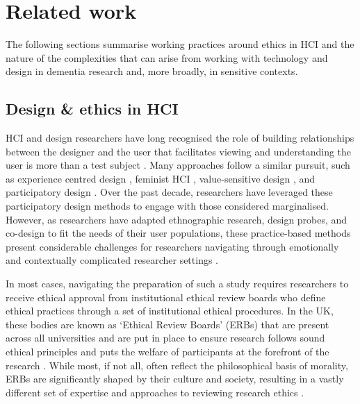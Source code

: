 \section{Related work}
\label{Ethics:RelatedWork}
The following sections summarise working practices around ethics in HCI and the nature of the complexities that can arise from working with technology and design in dementia research and, more broadly, in sensitive contexts.

\subsection{Design \& ethics in HCI}
\label{RelatedWork:DesignEthics}
HCI and design researchers have long recognised the role of building relationships between the designer and the user that facilitates viewing and understanding the user is more than a test subject \citep{wright2008empathy}. Many approaches follow a similar pursuit, such as experience centred design \citep{morrissey_value_2017}, feminist HCI \citep{bardzell_towards_2011}, value-sensitive design \citep{friedman_value-sensitive_1996}, and participatory design \citep{bannon2018introduction}. Over the past decade, researchers have leveraged these participatory design methods to engage with those considered marginalised. However, as researchers have adapted ethnographic research, design probes, and co-design to fit the needs of their user populations, these practice-based methods present considerable challenges for researchers navigating through emotionally and contextually complicated researcher settings \citep{vines_configuring_2013}.

In most cases, navigating the preparation of such a study requires researchers to receive ethical approval from institutional ethical review boards who define ethical practices through a set of institutional ethical procedures. In the UK, these bodies are known as ‘Ethical Review Boards’ (ERBs) that are present across all universities and are put in place to ensure research follows sound ethical principles and puts the welfare of participants at the forefront of the research \citep{pachana_can_2014}. While most, if not all, often reflect the philosophical basis of morality, ERBs are significantly shaped by their culture and society, resulting in a vastly different set of expertise and approaches to reviewing research ethics \citep{flicker_ethical_2007}.


